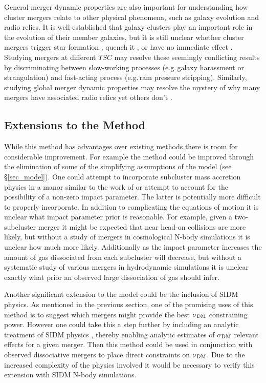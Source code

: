 \documentclass[12pt]{emulateapj}
\begin{document}
General merger dynamic properties are also important for understanding  how cluster mergers relate to other physical phenomena, such as galaxy evolution and radio relics.  
It is well established that galaxy clusters play an important role in the evolution of their member galaxies, but it is still unclear whether cluster mergers trigger star formation \citep[e.g.][]{Miller:2003kx,Owen:2005dx,Ferrari:2005es,Hwang:2009ip}, quench it \citep{Poggianti:2004ca}, or have no immediate effect \citep{Chung:2010ds}.
Studying mergers at different $TSC$ may resolve these seemingly conflicting results by  discriminating between slow-working processes (e.g.\,galaxy harassment or strangulation) and fast-acting process (e.g.\,ram pressure stripping). 
Similarly, studying global merger dynamic properties may resolve the mystery of why many mergers have associated radio relics \citep[e.g.][]{Barrena:2009to, vanWeeren:2011ko} yet others don't \citep[e.g.][]{Russell:2011hn}.

\subsection{Extensions to the Method}\label{sec_extensions}

While this method has advantages over existing methods there is room for considerable improvement.
For example the method could be improved through the elimination of some of the simplifying assumptions of the model (see \S\ref{sec_model}).
One could attempt to incorporate subcluster mass accretion physics in a manor similar to the work of \citet{Angus:2007em} or attempt to account for the possibility of a non-zero impact parameter.
The latter is potentially more difficult to properly incorporate.  In addition to complicating the equations of motion it is unclear what impact parameter prior is reasonable. 
For example, given a two-subcluster merger it might be expected that near head-on collisions are more likely, but without a study of mergers in cosmological N-body simulations it is unclear how much more likely.
Additionally as the impact parameter increases the amount of gas dissociated from each subcluster will decrease, but without a systematic study of various mergers in hydrodynamic simulations it is unclear exactly what prior an observed large dissociation of gas should infer.

Another significant extension to the model could be the inclusion of SIDM physics.  
As mentioned in the previous section, one of the promising uses of this method is to suggest which mergers might provide the best $\sigma_{\rm DM}$ constraining power.  
However one could take this a step further by including an analytic treatment of SIDM physics \citep[e.g.\,][]{Markevitch:2004dl}, thereby enabling analytic estimates of $\sigma_{\rm DM}$ relevant effects for a given merger.
Then this method could be used in conjunction with observed dissociative mergers to place direct constraints on $\sigma_{\rm DM}$.
Due to the increased complexity of the physics involved
it would be necessary to verify this extension with SIDM N-body simulations.
\end{document}
